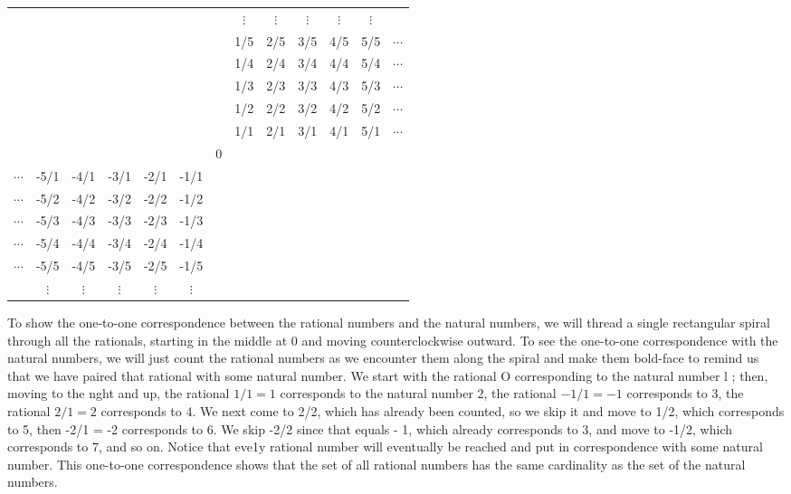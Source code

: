 \begin{center}
	{ \small
\begin{tabular}{*{13}{c}}
 &  &  &  &  &  &  & $\vdots$ & $\vdots$ & $\vdots$ & $\vdots$ & $\vdots$ & \\
 &  &  &  &  &  &  & 1/5 & 2/5 & 3/5 & 4/5 & 5/5 & $\cdots$\\
 &  &  &  &  &  &  & 1/4 & 2/4 & 3/4 & 4/4 & 5/4 & $\cdots$\\
 &  &  &  &  &  &  & 1/3 & 2/3 & 3/3 & 4/3 & 5/3 & $\cdots$\\
 &  &  &  &  &  &  & 1/2 & 2/2 & 3/2 & 4/2 & 5/2 & $\cdots$\\
 &  &  &  &  &  &  & 1/1 & 2/1 & 3/1 & 4/1 & 5/1 & $\cdots$\\
 &  &  &  &  &  & 0 &  &  &  &  &  & \\
$\cdots$ & -5/1 & -4/1 & -3/1 & -2/1 & -1/1 &  &  &  &  &  &  & \\
$\cdots$ & -5/2 & -4/2 & -3/2 & -2/2 & -1/2 &  &  &  &  &  &  & \\
$\cdots$ & -5/3 & -4/3 & -3/3 & -2/3 & -1/3 &  &  &  &  &  &  & \\
$\cdots$ & -5/4 & -4/4 & -3/4 & -2/4 & -1/4 &  &  &  &  &  &  & \\
$\cdots$ & -5/5 & -4/5 & -3/5 & -2/5 & -1/5 &  &  &  &  &  &  & \\
 & $\vdots$ & $\vdots$ & $\vdots$ & $\vdots$ & $\vdots$ &  &  &  &  &  &  & 
\end{tabular}}
\end{center}
To show the one-to-one correspondence between the rational numbers and the natural numbers, we will thread a single rectangular spiral through all the rationals, starting in the middle at 0 and moving counterclockwise outward. To see the one-to-one correspondence with the natural numbers, we will just count the rational numbers as we encounter them along the spiral and make them bold-face to remind us that we have paired that rational with some natural number. We start with the rational O corresponding to the natural number l ; then, moving to the nght and up, the rational $1/1 = 1$ corresponds to the natural number 2, the rational $-1/1 = - 1$ corresponds to 3, the rational $2/1 = 2$ corresponds to 4. We next come to 2/2, which has already been counted, so we skip it and move to 1/2, which corresponds to 5, then -2/1 = -2 corresponds to 6. We skip -2/2 since that equals - 1, which already corresponds to 3, and move to -1/2, which corresponds to 7, and so on. Notice that eve1y rational number will eventually be reached and put in correspondence with some natural number. This one-to-one correspondence shows that the set of all rational numbers has the same cardinality as the set of the natural numbers.  


